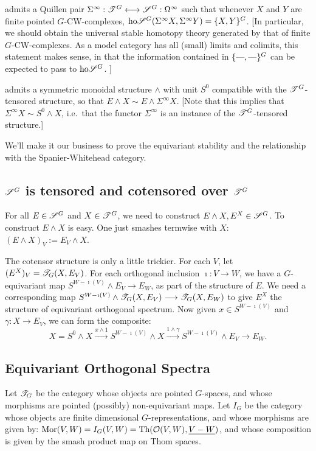 \documentclass[11pt]{article}
\begin{document}
\begin{FifthWeek}
\begin{itemise}
\item admits a Quillen pair $\Sigma^\infty:\mathscr{T}^G\longleftrightarrow \mathscr{S}^G:\Omega^\infty$ such that whenever $X$ and $Y$ are finite pointed $G$-CW-complexes, $\textup{ho}\mathscr{S}^G(\Sigma^\infty X,\Sigma^\infty Y)=\{X,Y\}^G$. 
[In particular, we should obtain the universal stable homotopy theory generated by that of finite $G$-CW-complexes. As a model category has all (small) limits and colimits, this statement makes sense, in that the information contained in $\{\textup{---},\textup{---}\}^G$ can be expected to pass to $\textup{ho}\mathscr{S}^G$. ]
\item admits a symmetric monoidal structure $\wedge$ with unit $S^0$ compatible with the $\mathscr{T}^G$-tensored structure, so that $E\wedge X\sim E\wedge \Sigma^\infty X$. [Note that this implies that $\Sigma^\infty X\sim S^0\wedge X$, i.e.\ that the functor $\Sigma^\infty$ is an instance of the $\mathscr{T}^G$-tensored structure.]
\end{itemise}
We'll make it our business to prove the equivariant stability and the relationship with the Spanier-Whitehead category.
\subsection*{$\mathscr{S}^G$ is tensored and cotensored over $\mathscr{T}^G$}
For all $E\in\mathscr{S}^G$ and $X\in\mathscr{T}^G$, we need to construct $E\wedge X,E^X\in\mathscr{S}^G$. To construct $E\wedge X$ is easy. One just smashes termwise with $X$: $(E\wedge X)_V:=E_V\wedge X$.

The cotensor structure is only a little trickier. For each $V$, let $(E^X)_V=\mathscr{T}_G(X,E_V)$. For each orthogonal inclusion $\imath:V\to W$, we have a $G$-equivariant map $S^{W-\imath(V)}\wedge E_V\to E_W$, as part of the structure of $E$. We need a corresponding map $S^{W-\imath(V)}\wedge \mathscr{T}_G(X,E_V)\longrightarrow\mathscr{T}_G(X,E_W)$ to give $E^X$ the structure of equivariant orthogonal spectrum. Now given $x\in S^{W-\imath(V)}$ and $\gamma:X\to E_V$, we can form the composite:
\[X=S^0\wedge X\overset{x\wedge1}{\to}S^{W-\imath(V)}\wedge X\overset{1\wedge\gamma}{\to} S^{W-\imath(V)}\wedge E_V\to E_W.\]
\subsection*{Equivariant Orthogonal Spectra}
Let $\mathscr{T}_G$ be the category whose objects are pointed $G$-spaces, and whose morphisms are pointed (possibly) non-equivariant maps. Let $I_G$ be the category whose objects are finite dimensional $G$-representations, and whose morphisms are given by: $\operatorname{Mor}(V,W)=I_G(V,W)=\text{Th}(\mathcal{O}(V,W),\underline{V-W})$, and whose composition is given by the smash product map on Thom spaces.


\end{FifthWeek}
\end{document}
